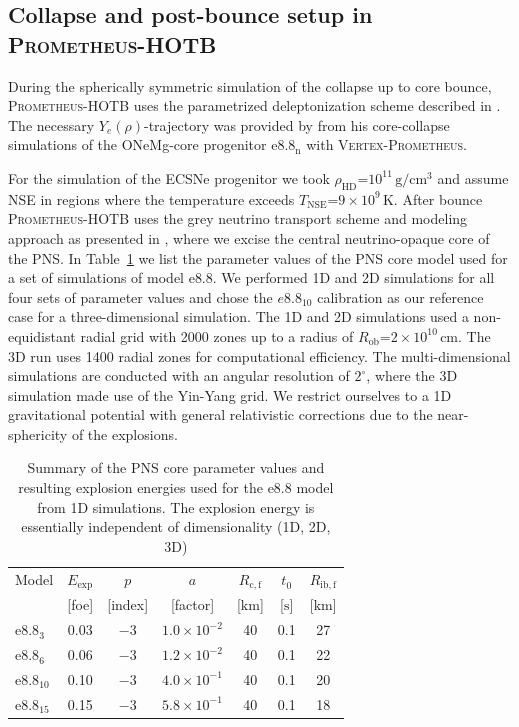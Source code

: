\documentclass[fleqn,usenatbib]{mnras}
\newcommand{\km}{\ensuremath{\mathrm{km}}}
\newcommand{\s}{\ensuremath{\text{s}}}
\newcommand{\prom}{\textsc{Prometheus-HOTB}\xspace}
\newcommand{\vertexprom}{\textsc{Vertex-Prometheus}\xspace}
\newcommand{\onemg}{\ensuremath{\mathrm{e8.8}}\xspace}
\begin{document}
\subsection{Collapse and post-bounce setup in \prom}
\label{sec:Collapse and post-bounce setup in prom}
During the spherically symmetric simulation of the collapse up 
to core bounce, \prom uses the parametrized deleptonization scheme 
described in \citet{Liebendorfer2005}. The necessary 
$Y_{e}(\rho)$-trajectory was provided by \cite{Huedepohl2018} from 
his core-collapse simulations of the ONeMg-core progenitor 
$\mathrm{e8.8_{n}}$ with \vertexprom.

For the simulation of the ECSNe progenitor we took
$\rho_{\mathrm{HD}}\mathord{=}10^{11}\,\mathrm{g/cm^3}$ and 
assume NSE in regions where the 
temperature exceeds $T_{\mathrm{NSE}}\mathord{=}9\times10^9\,\mathrm{K}$.
After bounce \prom uses the grey neutrino transport scheme and
modeling approach as presented in \cite{Scheck2006}, where we 
excise the central neutrino-opaque core of the PNS.
In Table~\ref{table:e8param} we list the parameter values of the 
PNS core model used for a set of simulations of model \onemg. 
We performed 1D and 2D simulations for all four sets of parameter 
values and 
chose the $e8.8_{10}$ calibration as our reference case for a 
three-dimensional simulation. The 1D and 2D simulations used a 
non-equidistant 
radial grid with 2000 zones up to a radius of 
$R_{\mathrm{ob}}\mathord{=}2\times 10^{10}\,\text{cm}$. 
The 3D run uses 1400 radial zones for computational efficiency. 
The multi-dimensional simulations are conducted with an angular 
resolution of $2^{\circ}$, where the 3D simulation made use of
the Yin-Yang grid.
We restrict ourselves to a 1D gravitational potential with general 
relativistic corrections due to the near-sphericity of the explosions.

\begin{table}
\centering
\caption{Summary of the PNS core parameter values and resulting 
explosion energies used for the \onemg model from 1D simulations. The explosion energy 
is essentially independent of dimensionality (1D, 2D, 3D)}
  \label{table:e8param}
   \begin{tabular}{l  c   c   c   c   c   c}
  \hline
  Model &
  $E_{\mathrm{exp}}$ &
  $p$ & 
  $a$ & 
  $R_{\mathrm{c,f}}$ &
  $t_0$ & 
  $R_{\mathrm{ib,f}}$ \\
                &
  [foe] &
  [index] &
  [factor] &
  [$\km$]  &
  [$\s$] &
  [$\km$] \\
  \hline
  $\mathrm{e}8.8_{3}$  & 0.03 & $-3$ & $1.0\times 10^{-2}$ & 40 & 0.1 &  27 \\
  $\mathrm{e}8.8_{6}$  & 0.06 & $-3$ & $1.2\times 10^{-2}$ & 40 & 0.1 &  22 \\
  $\mathrm{e}8.8_{10}$ & 0.10 & $-3$ & $4.0\times 10^{-1}$ & 40 & 0.1 &  20 \\
  $\mathrm{e}8.8_{15}$ & 0.15 & $-3$ & $5.8\times 10^{-1}$ & 40 & 0.1 &  18 \\
  \hline
  \end{tabular}
\end{table}
\end{document}
